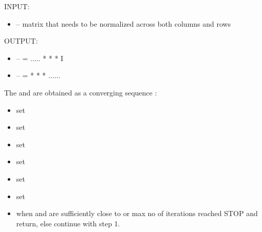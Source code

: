 \documentclass[letterpaper,10pt,english]{sphinxmanual}
\begin{document}
\begin{fulllineitems}
\label{index:diagscale.norm_rc}
INPUT:
\begin{itemize}
\item {} 
 -- matrix that needs to be normalized across both columns and rows

\end{itemize}

OUTPUT:
\begin{itemize}
\item {} 
 --  = .....  *  *  * I

\item {} 
 --  =  *  *  * ......

\end{itemize}

The  and  are obtained as a converging sequence :
\begin{itemize}
\item {} 
set 

\item {} 
set 

\item {} 
set 

\item {} 
set 

\item {} 
set 

\item {} 
set 

\item {} 
when  and  are sufficiently close to  or max no of iterations reached
STOP and return, else continue with step 1.

\end{itemize}

\end{fulllineitems}

\end{document}
